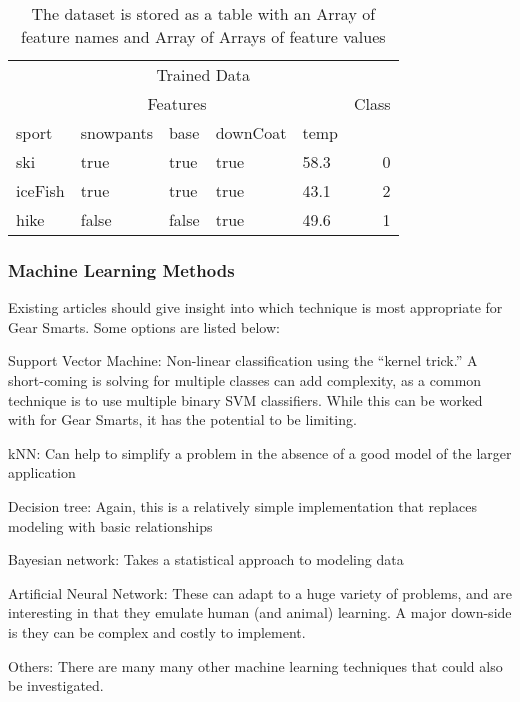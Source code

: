 \begin{table}
\label{table:dictionary}
    \begin{tabular}{lllllr}
        \hline
        \multicolumn{6}{c}{Trained Data} \\
        \multicolumn{5}{c}{Features} & Class \\
        \hline
        sport   & snowpants & base  & downCoat & temp   \\
        \hline
        \hline
        ski     & true      & true  & true      & 58.3  & 0 \\
        iceFish & true      & true  & true      & 43.1  & 2 \\
        hike    & false     & false & true      & 49.6  & 1 \\
        \hline
    \end{tabular}
    \caption{The dataset is stored as a table with an Array of feature names and Array of Arrays of feature values}
\end{table}


\subsubsection{Machine Learning Methods}
\label{section:mloptions}
Existing articles should give insight into which technique is
most appropriate for Gear Smarts. Some options are listed below:

\begin{description}
  \item{Support Vector Machine:} Non-linear classification using the ``kernel trick.'' A short-coming is solving for multiple
  classes can add complexity, as a common technique is to use multiple binary SVM classifiers. While this can be worked with
  for Gear Smarts, it has the potential to be limiting.
  \item{kNN:} Can help to simplify a problem in the absence of a good model of the larger application
  \item{Decision tree:} Again, this is a relatively simple implementation that replaces modeling with basic relationships
  \item{Bayesian network:} Takes a statistical approach to modeling data
  \item{Artificial Neural Network:} These can adapt to a huge variety of problems, and are interesting in that they emulate
  human (and animal) learning. A major down-side is they can be complex and costly to implement.
  \item{Others:} There are many many other machine learning techniques that could also be investigated.
\end{description}

